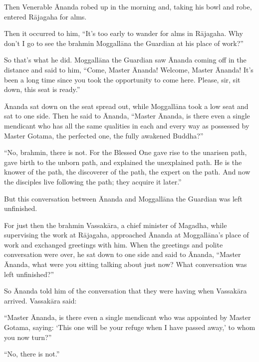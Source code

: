 \documentclass[12pt,openany]{book}%
\begin{document}
Then Venerable Ānanda robed up in the morning and, taking his bowl and robe, entered \textsanskrit{Rājagaha} for alms. 

Then it occurred to him, “It’s too early to wander for alms in \textsanskrit{Rājagaha}. Why don’t I go to see the brahmin \textsanskrit{Moggallāna} the Guardian at his place of work?” 

So that’s what he did. \textsanskrit{Moggallāna} the Guardian saw Ānanda coming off in the distance and said to him, “Come, Master Ānanda! Welcome, Master Ānanda! It’s been a long time since you took the opportunity to come here. Please, sir, sit down, this seat is ready.” 

Ānanda sat down on the seat spread out, while \textsanskrit{Moggallāna} took a low seat and sat to one side. Then he said to Ānanda, “Master Ānanda, is there even a single mendicant who has all the same qualities in each and every way as possessed by Master Gotama, the perfected one, the fully awakened Buddha?” 

“No, brahmin, there is not. For the Blessed One gave rise to the unarisen path, gave birth to the unborn path, and explained the unexplained path. He is the knower of the path, the discoverer of the path, the expert on the path. And now the disciples live following the path; they acquire it later.” 

But this conversation between Ānanda and \textsanskrit{Moggallāna} the Guardian was left unfinished. 

For just then the brahmin \textsanskrit{Vassakāra}, a chief minister of Magadha, while supervising the work at \textsanskrit{Rājagaha}, approached Ānanda at \textsanskrit{Moggallāna}’s place of work and exchanged greetings with him. When the greetings and polite conversation were over, he sat down to one side and said to Ānanda, “Master Ānanda, what were you sitting talking about just now? What conversation was left unfinished?” 

So Ānanda told him of the conversation that they were having when \textsanskrit{Vassakāra} arrived. \textsanskrit{Vassakāra} said: 

“Master Ānanda, is there even a single mendicant who was appointed by Master Gotama, saying: ‘This one will be your refuge when I have passed away,’ to whom you now turn?” 

“No, there is not.” 
\end{document}
